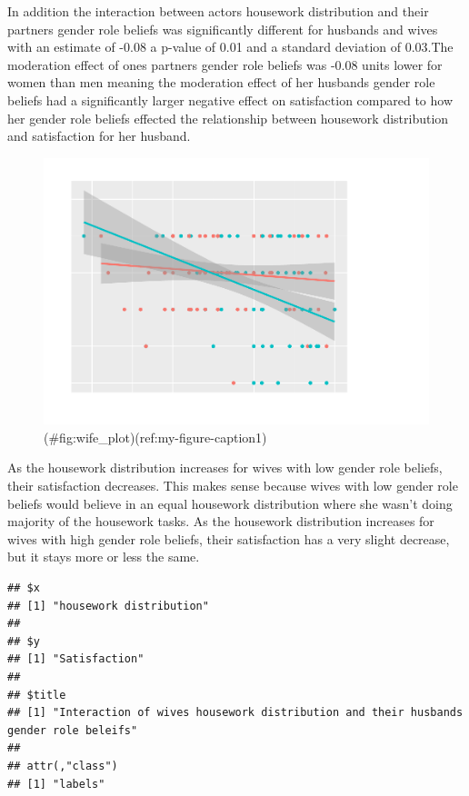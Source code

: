 \documentclass[
  english,
  man,floatsintext]{apa6}
\begin{document}
In addition the interaction between actors housework distribution and their partners gender role beliefs was significantly different for husbands and wives with an estimate of -0.08 a p-value of 0.01 and a standard deviation of 0.03.The moderation effect of ones partners gender role beliefs was -0.08 units lower for women than men meaning the moderation effect of her husbands gender role beliefs had a significantly larger negative effect on satisfaction compared to how her gender role beliefs effected the relationship between housework distribution and satisfaction for her husband.

\begin{figure}
\centering
\includegraphics{results_files/figure-latex/wife_plot-1.pdf}
\caption{(\#fig:wife\_plot)(ref:my-figure-caption1)}
\end{figure}



As the housework distribution increases for wives with low gender role beliefs, their satisfaction decreases. This makes sense because wives with low gender role beliefs would believe in an equal housework distribution where she wasn't doing majority of the housework tasks. As the housework distribution increases for wives with high gender role beliefs, their satisfaction has a very slight decrease, but it stays more or less the same.

\begin{verbatim}
## $x
## [1] "housework distribution"
## 
## $y
## [1] "Satisfaction"
## 
## $title
## [1] "Interaction of wives housework distribution and their husbands gender role beleifs"
## 
## attr(,"class")
## [1] "labels"
\end{verbatim}
\end{document}
